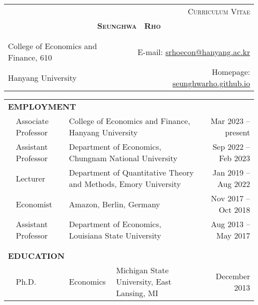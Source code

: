 \documentclass[10pt]{article}
\begin{document}
\begin{center}
\begin{tabular}{lr}
& \textsc{Curriculum Vitae } \\
\multicolumn{2}{c}{{\Large \textsc{\textbf{Seunghwa \ Rho }}}}\\ 
\multicolumn{2}{p{510pt}}{}\\
\hline\\
College of Economics and Finance, 610 & E-mail: \href{mailto:srhoecon@hanyang.ac.kr}{srhoecon@hanyang.ac.kr} \\
\multicolumn{1}{l}{Hanyang University}&Homepage: \href{https://seunghwarho.github.io}{seunghwarho.github.io}
\end{tabular}

\bigskip \bigskip \bigskip 
\begin{tabular}{llllr}
\multicolumn{5}{l}{{\Large \textbf{E}}\textbf{MPLOYMENT}} \vspace{0.1cm}\\
&\multicolumn{1}{l}{Associate Professor} & \multicolumn{2}{l}{College of Economics and Finance, Hanyang University}& \multicolumn{1}{r}{Mar 2023 -- present}\vspace{0.1cm} \\
&\multicolumn{1}{l}{Assistant Professor} & \multicolumn{2}{l}{Department of Economics, Chungnam National University}& \multicolumn{1}{r}{Sep 2022 -- Feb 2023}\vspace{0.1cm} \\
&\multicolumn{1}{l}{Lecturer} & \multicolumn{2}{l}{Department of Quantitative Theory and Methods, Emory University}& \multicolumn{1}{r}{Jan 2019 -- Aug 2022}\vspace{0.1cm} \\
&\multicolumn{1}{l}{Economist} & \multicolumn{2}{l}{Amazon, Berlin, Germany}& \multicolumn{1}{r}{Nov 2017 -- Oct 2018}\vspace{0.1cm} \\
&\multicolumn{1}{l}{Assistant Professor} &\multicolumn{2}{l}{Department of Economics, Louisiana State University}& \multicolumn{1}{r}{Aug 2013 -- May 2017} \\
\multicolumn{5}{p{460pt}}{}\\\\
\multicolumn{5}{l}{{\Large \textbf{E}}\textbf{DUCATION}} \vspace{0.1cm}\\
&\multicolumn{1}{l}{Ph.D.} & \multicolumn{1}{l}{Economics}&\multicolumn{1}{l}{Michigan State University, East Lansing, MI}& \multicolumn{1}{r}{December 2013} \\

\end{tabular}
\end{center}
\end{document}
